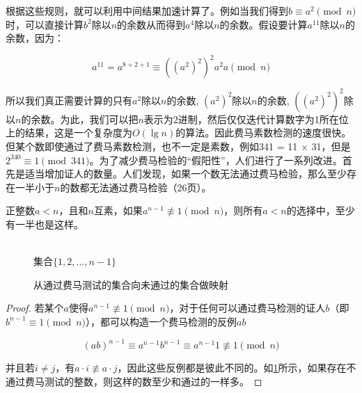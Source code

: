 \documentclass[b5paper]{ctexart}
\begin{document}
根据这些规则，就可以利用中间结果加速计算了。例如当我们得到$b \equiv a^2 \pmod{n}$时，可以直接计算$b^2$除以$n$的余数从而得到$a^4$除以$n$的余数。假设要计算$a^{11}$除以$n$的余数，因为：

\[
a^{11} = a^{8 + 2 + 1} \equiv ((a^2)^2)^2a^2a \pmod{n}
\]

所以我们真正需要计算的只有$a^2$除以$n$的余数, $(a^2)^2$除以$n$的余数, $((a^2)^2)^2$除以$n$的余数。为此，我们可以把$n$表示为2进制，然后仅仅迭代计算数字为1所在位上的结果，这是一个复杂度为$O(\lg n)$的算法。因此费马素数检测的速度很快。但某个数即使通过了费马素数检测，也不一定是素数，例如341 = 11 $\times$ 31，但是$2^{340} \equiv 1 \pmod{341}$。为了减少费马检验的“假阳性”，人们进行了一系列改进。首先是适当增加证人的数量。人们发现，如果一个数无法通过费马检验，那么至少存在一半小于$n$的数都无法通过费马检验\cite{Algorithms-DPV}（26页）。

\begin{proposition}
正整数$a<n$，且和$n$互素，如果$a^{n-1} \not\equiv 1 \pmod n$，则所有$a<n$的选择中，至少有一半也是这样。
\end{proposition}

\begin{figure}[htbp]
\centering
{} \\
集合$\{1, 2, ..., n-1\}$
\caption{从通过费马测试的集合向未通过的集合做映射}
\label{fig:Fermat-test}
\end{figure}

\begin{proof}
若某个$a$使得$a^{n-1} \not\equiv 1 \pmod n$，对于任何可以通过费马检测的证人$b$（即$b^{n-1} \equiv 1 \pmod n$），都可以构造一个费马检测的反例$ab$

\[
(ab)^{n-1} \equiv a^{n-1}b^{n-1} \equiv a^{n-1}1 \not\equiv 1 \pmod n
\]

并且若$i \neq j$，有$a \cdot i \not\equiv a \cdot j$，因此这些反例都是彼此不同的。如\cref{fig:Fermat-test}所示，如果存在不通过费马测试的整数，则这样的数至少和通过的一样多。
\end{proof}
\end{document}

